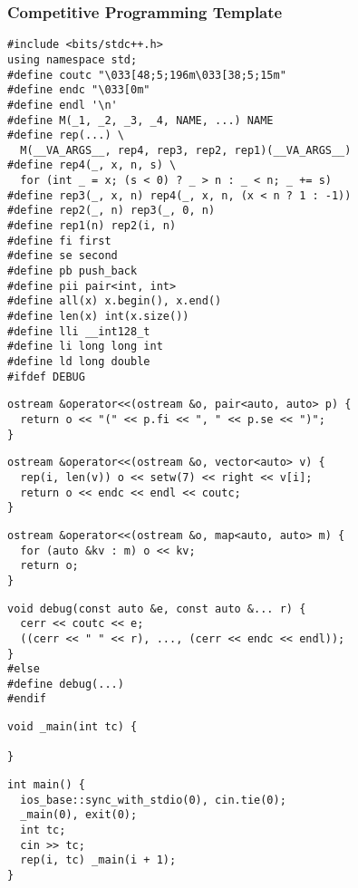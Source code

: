 \documentclass[twoside]{article}
\begin{document}
\begin{multicols*}{2}
\subsubsection*{Competitive Programming Template}
\begin{verbatim}
#include <bits/stdc++.h>
using namespace std;
#define coutc "\033[48;5;196m\033[38;5;15m"
#define endc "\033[0m"
#define endl '\n'
#define M(_1, _2, _3, _4, NAME, ...) NAME
#define rep(...) \
  M(__VA_ARGS__, rep4, rep3, rep2, rep1)(__VA_ARGS__)
#define rep4(_, x, n, s) \
  for (int _ = x; (s < 0) ? _ > n : _ < n; _ += s)
#define rep3(_, x, n) rep4(_, x, n, (x < n ? 1 : -1))
#define rep2(_, n) rep3(_, 0, n)
#define rep1(n) rep2(i, n)
#define fi first
#define se second
#define pb push_back
#define pii pair<int, int>
#define all(x) x.begin(), x.end()
#define len(x) int(x.size())
#define lli __int128_t
#define li long long int
#define ld long double
#ifdef DEBUG
\end{verbatim}
\vspace{-12pt}
\begin{verbatim}
ostream &operator<<(ostream &o, pair<auto, auto> p) {
  return o << "(" << p.fi << ", " << p.se << ")";
}
\end{verbatim}
\vspace{-12pt}
\begin{verbatim}
ostream &operator<<(ostream &o, vector<auto> v) {
  rep(i, len(v)) o << setw(7) << right << v[i];
  return o << endc << endl << coutc;
}
\end{verbatim}
\vspace{-12pt}
\begin{verbatim}
ostream &operator<<(ostream &o, map<auto, auto> m) {
  for (auto &kv : m) o << kv;
  return o;
}
\end{verbatim}
\vspace{-12pt}
\begin{verbatim}
void debug(const auto &e, const auto &... r) {
  cerr << coutc << e;
  ((cerr << " " << r), ..., (cerr << endc << endl));
}
#else
#define debug(...)
#endif
\end{verbatim}
\vspace{-12pt}
\begin{verbatim}
void _main(int tc) {

}
\end{verbatim}
\vspace{-12pt}
\begin{verbatim}
int main() {
  ios_base::sync_with_stdio(0), cin.tie(0);
  _main(0), exit(0);
  int tc;
  cin >> tc;
  rep(i, tc) _main(i + 1);
}
\end{verbatim}


\end{multicols*}
\end{document}
